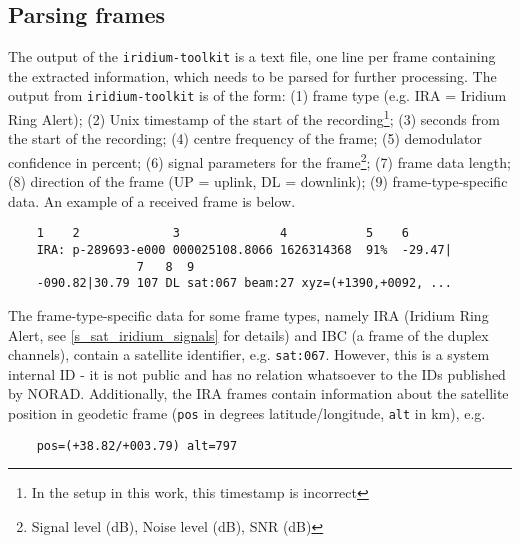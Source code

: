 \subsection{Parsing frames}
The output of the \texttt{iridium-toolkit} is a text file, one line per frame containing the extracted information, which needs to be parsed for further processing. The output from \texttt{iridium-toolkit} is of the form: (1) frame type (e.g. IRA = Iridium Ring Alert); (2) Unix timestamp of the start of the recording\footnote{In the setup in this work, this timestamp is incorrect}; (3) seconds from the start of the recording; (4) centre frequency of the frame; (5) demodulator confidence in percent;  (6) signal parameters for the frame\footnote{Signal level (dB), Noise level (dB), SNR (dB)}; (7) frame data length; (8) direction of the frame (UP = uplink, DL = downlink); (9) frame-type-specific data. An example of a received frame is below.

\vspace{\parskip}
\noindent\begin{minipage}{\textwidth}
\begin{verbatim}
    1    2             3              4           5    6
    IRA: p-289693-e000 000025108.8066 1626314368  91%  -29.47|
                  7   8  9
    -090.82|30.79 107 DL sat:067 beam:27 xyz=(+1390,+0092, ...
\end{verbatim}
\end{minipage}
\vspace{\parskip}

The frame-type-specific data for some frame types, namely IRA (Iridium Ring Alert, see  \autoref{s_sat_iridium_signals} for details) and IBC (a frame of the duplex channels), contain a satellite identifier, e.g. \texttt{sat:067}. However, this is a system internal ID - it is not public and has no relation whatsoever to the IDs published by NORAD\cite{des14}. Additionally, the IRA frames contain information about the satellite position in geodetic frame (\texttt{pos} in degrees latitude/longitude, \texttt{alt} in km), e.g.

\begin{verbatim}
    pos=(+38.82/+003.79) alt=797
\end{verbatim}

